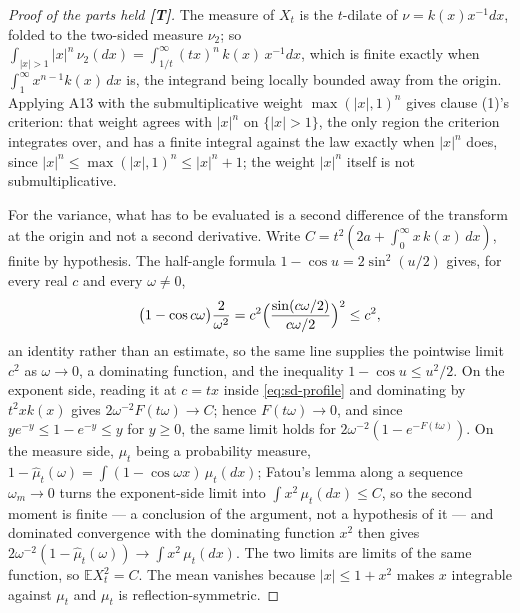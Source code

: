 \begin{proof}[Proof of the parts held \textbf{[T]}]
The \Levy{} measure of $X_t$ is the $t$-dilate of $\nu = k(x)x^{-1}dx$, folded to the two-sided
measure $\nu_2$; so
$\int_{|x|>1}|x|^n\,\nu_2(dx) = \int_{1/t}^\infty (tx)^n\,k(x)\,x^{-1}dx$, which is finite
exactly when $\int_1^\infty x^{n-1}k(x)\,dx$ is, the integrand being locally bounded away from
the origin. Applying A13 with the submultiplicative weight $\max(|x|,1)^n$ gives clause (1)'s
criterion: that weight agrees with $|x|^n$ on $\{|x| > 1\}$, the only region the criterion
integrates over, and has a finite integral against the law exactly when $|x|^n$ does, since
$|x|^n \le \max(|x|,1)^n \le |x|^n + 1$; the weight $|x|^n$ itself is not submultiplicative.

For the variance, what has to be evaluated is a second difference of the transform at the
origin and not a second derivative. Write $C = t^2(2a + \int_0^\infty x\,k(x)\,dx)$, finite by
hypothesis. The half-angle formula $1 - \cos u = 2\sin^2(u/2)$ gives, for every real $c$ and
every $\omega \ne 0$,
\[
  \bigl(1 - \cos c\omega\bigr)\frac{2}{\omega^2}
   = c^2\Bigl(\frac{\sin(c\omega/2)}{c\omega/2}\Bigr)^2 \le c^2 ,
\]
an identity rather than an estimate, so the same line supplies the pointwise limit $c^2$ as
$\omega \to 0$, a dominating function, and the inequality $1 - \cos u \le u^2/2$. On the
exponent side, reading it at $c = tx$ inside \ref{eq:sd-profile} and dominating by $t^2xk(x)$
gives $2\omega^{-2}F(t\omega) \to C$; hence $F(t\omega) \to 0$, and since
$ye^{-y} \le 1 - e^{-y} \le y$ for $y \ge 0$, the same limit holds for
$2\omega^{-2}(1 - e^{-F(t\omega)})$. On the measure side, $\mu_t$ being a probability measure,
$1 - \hat\mu_t(\omega) = \int(1 - \cos\omega x)\,\mu_t(dx)$; Fatou's lemma along a sequence
$\omega_m \to 0$ turns the exponent-side limit into $\int x^2\,\mu_t(dx) \le C$, so the second
moment is finite --- a conclusion of the argument, not a hypothesis of it --- and dominated
convergence with the dominating function $x^2$ then gives
$2\omega^{-2}(1 - \hat\mu_t(\omega)) \to \int x^2\,\mu_t(dx)$. The two limits are limits of the
same function, so $\mathbb{E}X_t^2 = C$. The mean vanishes because $|x| \le 1 + x^2$ makes $x$
integrable against $\mu_t$ and $\mu_t$ is reflection-symmetric.


\end{proof}

